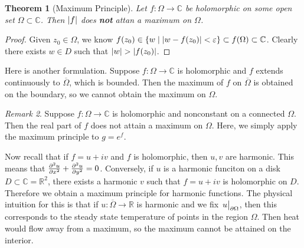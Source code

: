 \documentclass[leqno, openany]{memoir}
\newtheorem{thm}{Theorem}[section]
\theoremstyle{definition}
\theoremstyle{remark}
\newtheorem{rmk}[thm]{Remark}
\theoremstyle{plain}
\theoremstyle{definition}
\theoremstyle{remark}
\newcommand{\R}{\mathbb{R}}
\newcommand{\C}{\mathbb{C}}
\newcommand{\ep}{\varepsilon}
\newcommand{\ol}[1]{\overline{#1}}
\begin{document}
\begin{thm}[Maximum Principle]
    Let $f \colon \Omega \to \C$ be holomorphic on some open set $\Omega \subset \C$. Then $\abs{f}$ does \textbf{not} attan a maximum on $\Omega$.
\end{thm}

\begin{proof}
    Given $z_0 \in \Omega$, we know $f(z_0) \in \qty{w \mid \abs{w - f(z_0)} < \ep} \subset f(\Omega) \subset \C$. Clearly there exists $w \in D$ such that $\abs{w} > \abs{f(z_0)}$.
\end{proof}

Here is another formulation. Suppose $f \colon \Omega \to \C$ is holomorphic and $f$ extends continuously to $\ol{\Omega}$, which is bounded. Then the maximum of $f$ on $\ol{\Omega}$ is obtained on the boundary, so we cannot obtain the maximum on $\Omega$.

\begin{rmk}
    Suppose $f \colon \Omega \to \C$ is holomorphic and nonconstant on a connected $\Omega$. Then the real part of $f$ does not attain a maximum on $\Omega$. Here, we simply apply the maximum principle to $g = e^f$.
\end{rmk}

Now recall that if $f = u + iv$ and $f$ is holomorphic, then $u, v$ are harmonic. This means that $\pdv[2]{u}{x} + \pdv[2]{u}{y} = 0$. Conversely, if $u$ is a harmonic funciton on a disk $D \subset \C = \R^2$, there exists a harmonic $v$ such that $f = u+iv$ is holomorphic on $D$. Therefore we obtain a maximum principle for harmonic functions. The physical intuition for this is that if $u \colon \ol{\Omega} \to \R$ is harmonic and we fix $\eval{u}_{\partial \Omega}$, then this corresponds to the steady state temperature of points in the region $\Omega$. Then heat would flow away from a maximum, so the maximum cannot be attained on the interior.
\end{document}
